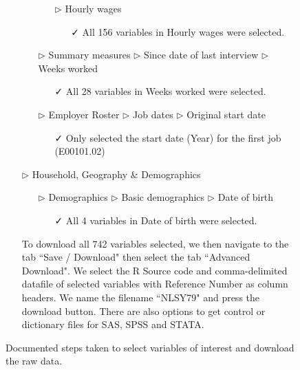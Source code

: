 \documentclass{article}
\begin{document}
\begin{figure}[p]
\begin{tcolorbox}[title = Navigating the data source, fontupper=\linespread{.8}\selectfont]
\begin{itemize}
\begin{itemize}
\begin{itemize}
\begin{itemize}
\end{itemize}
\item[$\triangleright$] Hourly wages
\begin{itemize}
\item[\faCheck] All 156 variables in Hourly wages were selected.
\end{itemize}
\end{itemize}
\end{itemize}
\begin{itemize}
\item[$\triangleright$] Summary measures $\triangleright$ Since date of last interview $\triangleright$ Weeks worked
\begin{itemize}
\item[\faCheck] All 28 variables in Weeks worked were selected.
\end{itemize}
\end{itemize}
\begin{itemize}
\item[$\triangleright$] Employer Roster $\triangleright$ Job dates $\triangleright$ Original start date
\begin{itemize}
\item[\faCheck] Only selected the start date (Year) for the first job (E00101.02)
\end{itemize}
\end{itemize}
\item[$\triangleright$] Household, Geography \& Demographics
\begin{itemize}
\item[$\triangleright$] Demographics $\triangleright$ Basic demographics $\triangleright$ Date of birth
\begin{itemize}
\item[\faCheck] All 4 variables in Date of birth were selected. 
\end{itemize}
\end{itemize}
\end{itemize}
\begin{itemize}
\item[\faCloudDownload] To download all 742 variables selected, we then navigate to the tab ``Save / Download" then select the tab ``Advanced Download". We select the R Source code and comma-delimited datafile of selected variables with Reference Number as column headers. We name the filename ``NLSY79" and press the download button. There are also options to get control or dictionary files for SAS, SPSS and STATA. 
\end{itemize}
\end{tcolorbox}
\caption{Documented steps taken to select variables of interest and download the raw data.\label{fig:source-nav}}
\end{figure}
\end{document}
